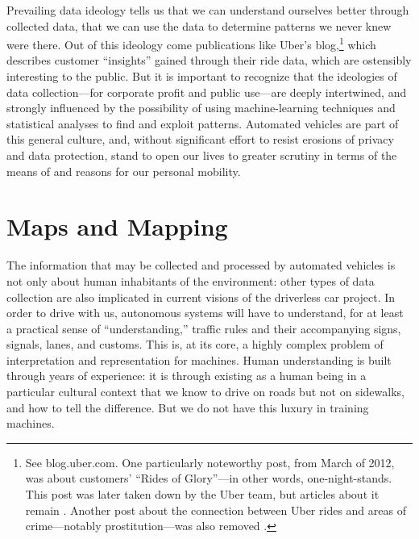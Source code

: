 
Prevailing data ideology tells us that we can understand ourselves better through
collected data, that we can use the data to determine patterns we never knew were
there. Out of this ideology come publications like Uber's
blog,\footnote{See blog.uber.com. One particularly noteworthy post,
  from March of 2012, was about customers' ``Rides of Glory''---in
  other words, one-night-stands. This post was later taken down by the
Uber team, but articles about it remain \cite{gigaomHarris}. Another
post about the connection between Uber rides and areas of
crime---notably prostitution---was also removed \cite{venturebeatObrien}.} which
describes customer ``insights'' gained through their ride data, which
are ostensibly interesting to the public. But it is important to
recognize that the ideologies of data collection---for corporate
profit and public use---are deeply intertwined, and strongly
influenced by the possibility of using machine-learning techniques and
statistical analyses to find and exploit patterns. Automated vehicles
are part of this general culture, and, without significant effort to
resist erosions of privacy and data protection, stand to open our lives
to greater scrutiny in terms of the means of and reasons for our
personal mobility.



\section{Maps and Mapping}

The information that may be collected and processed by automated
vehicles is not only about human inhabitants of the environment: other
types of data collection are also implicated in current
visions of the driverless car project. In order to drive with us,
autonomous systems will have to understand,
for at least a practical sense of ``understanding,'' traffic rules and
their accompanying signs, signals, lanes, and customs. This is, at its
core, a highly complex problem of interpretation and representation
for machines. Human understanding is built
through years of experience: it is through existing as a human being
in a particular cultural context that we know to drive on roads but
not on sidewalks, and how to tell the difference. But we do not have
this luxury in training machines. %


